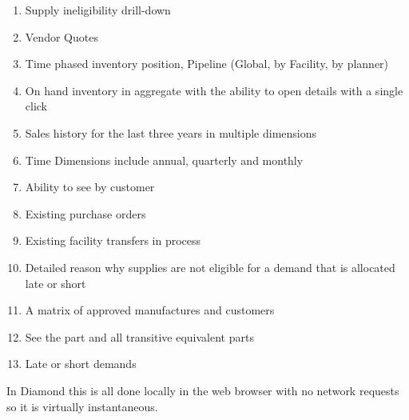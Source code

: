 \documentclass[letterpaper,10pt,english]{sphinxmanual}
\begin{document}
\begin{enumerate}
\item {} 
Supply ineligibility drill-down

\item {} 
Vendor Quotes

\item {} 
Time phased inventory position, Pipeline (Global, by Facility, by
planner)

\item {} 
On hand inventory in aggregate with the ability to open details with
a single click

\item {} 
Sales history for the last three years in multiple dimensions

\item {} 
Time Dimensions include annual, quarterly and monthly

\item {} 
Ability to see by customer

\item {} 
Existing purchase orders

\item {} 
Existing facility transfers in process

\item {} 
Detailed reason why supplies are not eligible for a demand that is
allocated late or short

\item {} 
A matrix of approved manufactures and customers

\item {} 
See the part and all transitive equivalent parts

\item {} 
Late or short demands

\end{enumerate}

In Diamond this is all done locally in the web browser with no network
requests so it is virtually instantaneous.
\end{document}
